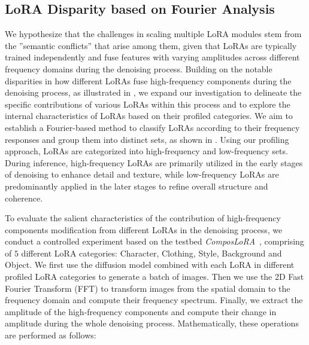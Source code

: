 \subsection{LoRA Disparity based on Fourier Analysis}
\vspace{-0.4em}
\label{sec:fourier}
We hypothesize that the challenges in scaling multiple LoRA modules stem from the ''semantic conflicts” that arise among them, given that LoRAs are typically trained independently and fuse features with varying amplitudes across different frequency domains during the denoising process. Building on the notable disparities in how different LoRAs fuse high-frequency components during the denoising process, as illustrated in , we expand our investigation to delineate the specific contributions of various LoRAs within this process and to explore the internal characteristics of LoRAs based on their profiled categories. We aim to establish a Fourier-based method to classify LoRAs according to their frequency responses and group them into distinct sets, as shown in . Using our profiling approach, LoRAs are categorized into high-frequency and low-frequency sets. During inference, high-frequency LoRAs are primarily utilized in the early stages of denoising to enhance detail and texture, while low-frequency LoRAs are predominantly applied in the later stages to refine overall structure and coherence.

To evaluate the salient characteristics of the contribution of high-frequency components modification from different LoRAs in the denoising process, we conduct a controlled experiment based on the testbed \textit{ComposLoRA}~\citep{multilora}, comprising of $5$ different LoRA categories: Character, Clothing, Style, Background and Object. We first use the diffusion model combined with each LoRA in different profiled LoRA categories to generate a batch of images. Then we use the 2D Fast Fourier Transform (FFT) to transform images from the spatial domain to the frequency domain and compute their frequency spectrum. Finally, we extract the amplitude of the high-frequency components and compute their change in amplitude during the whole denoising process. Mathematically, these operations are performed as follows:

